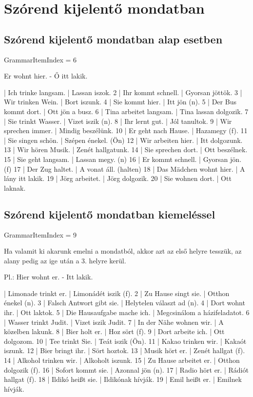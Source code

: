 \documentclass{article}
\newenvironment{desc}{\verbatim}{\endverbatim}
\newenvironment{exmp}{\verbatim}{\endverbatim}
\begin{document}
\section{Szórend kijelentő mondatban}

\subsection{Szórend kijelentő mondatban alap esetben}

GrammarItemIndex = 6

\begin{desc}
Er wohnt hier. - Ő itt lakik.
\end{desc}

\begin{exmp}
1 | Ich trinke langsam. | Lassan iszok.
2 | Ihr kommt schnell. | Gyorsan jöttök.
3 | Wir trinken Wein. | Bort iszunk.
4 | Sie kommt hier. | Itt jön (n).
5 | Der Bus kommt dort. | Ott jön a busz.
6 | Tina arbeitet langsam. | Tina lassan dolgozik.
7 | Sie trinkt Wasser. | Vizet iszik (n).
8 | Ihr lernt gut. | Jól tanultok.
9 | Wir sprechen immer. | Mindig beszélünk.
10 | Er geht nach Hause. | Hazamegy (f).
11 | Sie singen schön. | Szépen énekel. (Ön)
12 | Wir arbeiten hier. | Itt dolgozunk.
13 | Wir hören Musik. | Zenét hallgatunk.
14 | Sie sprechen dort. | Ott beszélnek.
15 | Sie geht langsam. | Lassan megy. (n)
16 | Er kommt schnell. | Gyorsan jön. (f)
17 | Der Zug haltet. | A vonat áll. (halten)
18 | Das Mädchen wohnt hier. | A lány itt lakik.
19 | Jörg arbeitet. | Jörg dolgozik.
20 | Sie wohnen dort. | Ott laknak.
\end{exmp}

\subsection{Szórend kijelentő mondatban kiemeléssel}

GrammarItemIndex = 9

\begin{desc}
Ha valamit ki akarunk emelni a mondatból, akkor azt az első helyre tesszük, az alany pedig az ige után a 3. helyre kerül.

Pl.: Hier wohnt er. - Itt lakik.
\end{desc}

\begin{exmp}
1 | Limonade trinkt er. | Limonádét iszik (f).
2 | Zu Hause singt sie. | Otthon énekel (n).
3 | Falsch Antwort gibt sie. | Helytelen választ ad (n).
4 | Dort wohnt ihr. | Ott laktok.
5 | Die Hausaufgabe mache ich. | Megcsinálom a házifeladatot.
6 | Wasser trinkt Judit. | Vizet iszik Judit.
7 | In der Nähe wohnen wir. | A közelben lakunk.
8 | Bier holt er. | Hoz sört (f).
9 | Dort arbeite ich. | Ott dolgozom.
10 | Tee trinkt Sie. | Teát iszik (Ön).
11 | Kakao trinken wir. | Kakaót iszunk.
12 | Bier bringt ihr. | Sört hoztok.
13 | Musik hört er. | Zenét hallgat (f).
14 | Alkohol trinken wir. | Alkoholt iszunk.
15 | Zu Hause arbeitet er. | Otthon dolgozik (f).
16 | Sofort kommt sie. | Azonnal jön (n).
17 | Radio hört er. | Rádiót hallgat (f).
18 | Ildikó heißt sie. | Ildikónak hívják.
19 | Emil heißt er. | Emilnek hívják.
\end{exmp}
\end{document}
